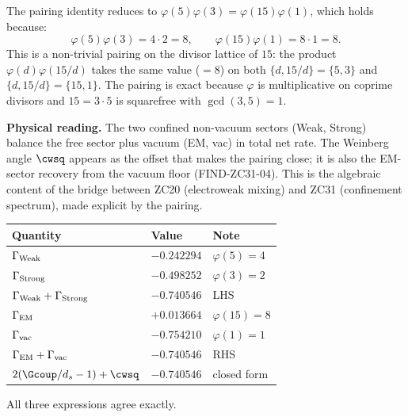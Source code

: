 \documentclass[12pt, a4paper]{article}
\begin{document}
\begin{derivedbox}[title={Why the pairing is exact: a multiplicative
  identity on $\varphi$}]
The pairing identity reduces to
$\varphi(5)\varphi(3) = \varphi(15)\varphi(1)$, which holds
because:
\[
  \varphi(5)\varphi(3) = 4 \cdot 2 = 8,
  \qquad
  \varphi(15)\varphi(1) = 8 \cdot 1 = 8.
\]
This is a non-trivial pairing on the divisor lattice of $15$:
the product $\varphi(d)\varphi(15/d)$ takes the same value
($= 8$) on both $\{d, 15/d\} = \{5, 3\}$ and
$\{d, 15/d\} = \{15, 1\}$. The pairing is exact because
$\varphi$ is multiplicative on coprime divisors and $15 = 3
\cdot 5$ is squarefree with $\gcd(3,5) = 1$.

\medskip
\textbf{Physical reading.} The two confined non-vacuum sectors
(Weak, Strong) balance the free sector plus vacuum (EM, vac)
in total net rate. The Weinberg angle $\cwsq$ appears as the
offset that makes the pairing close; it is also the EM-sector
recovery from the vacuum floor (FIND-ZC31-04). This is the
algebraic content of the bridge between ZC20 (electroweak
mixing) and ZC31 (confinement spectrum), made explicit by the
pairing.
\end{derivedbox}

\begin{derivedbox}[title={Numerical verification (THM-ZC34-03)}]
{\small
\renewcommand{\arraystretch}{1.30}
\begin{center}
\begin{tabular}{p{4.5cm}p{2.5cm}p{2.5cm}}
\toprule
\textbf{Quantity} & \textbf{Value} & \textbf{Note}\\
\midrule
$\Gamma_{\rm Weak}$    & $-0.242294$ & $\varphi(5)=4$\\
$\Gamma_{\rm Strong}$  & $-0.498252$ & $\varphi(3)=2$\\
$\Gamma_{\rm Weak}+\Gamma_{\rm Strong}$ & $-0.740546$ & LHS\\
\midrule
$\Gamma_{\rm EM}$      & $+0.013664$ & $\varphi(15)=8$\\
$\Gamma_{\rm vac}$     & $-0.754210$ & $\varphi(1)=1$\\
$\Gamma_{\rm EM}+\Gamma_{\rm vac}$ & $-0.740546$ & RHS\\
\midrule
$2(\Gcoup/d_s - 1) + \cwsq$ & $-0.740546$ & closed form\\
\bottomrule
\end{tabular}
\end{center}
}
\medskip
All three expressions agree exactly.
\end{derivedbox}
\end{document}
